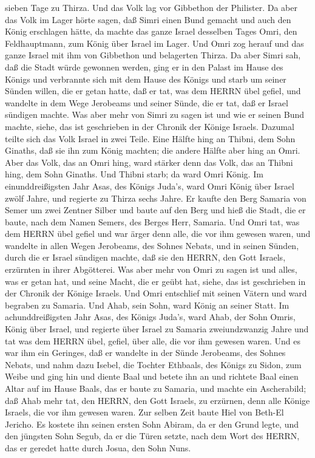 sieben Tage zu Thirza. Und das Volk lag vor Gibbethon der Philister.
 Da aber das Volk im Lager hörte sagen, daß Simri einen
Bund gemacht und auch den König erschlagen hätte, da machte das ganze
Israel desselben Tages Omri, den Feldhauptmann, zum König über Israel im
Lager.  Und Omri zog herauf und das ganze Israel mit ihm
von Gibbethon und belagerten Thirza.  Da aber Simri sah,
daß die Stadt würde gewonnen werden, ging er in den Palast im Hause des
Königs und verbrannte sich mit dem Hause des Königs und starb
 um seiner Sünden willen, die er getan hatte, daß er tat,
was dem HERRN übel gefiel, und wandelte in dem Wege Jerobeams und seiner
Sünde, die er tat, daß er Israel sündigen machte.  Was aber
mehr von Simri zu sagen ist und wie er seinen Bund machte, siehe, das
ist geschrieben in der Chronik der Könige Israels.  Dazumal
teilte sich das Volk Israel in zwei Teile. Eine Hälfte hing an Thibni,
dem Sohn Ginaths, daß sie ihn zum König machten; die andere Hälfte aber
hing an Omri.  Aber das Volk, das an Omri hing, ward
stärker denn das Volk, das an Thibni hing, dem Sohn Ginaths. Und Thibni
starb; da ward Omri König.  Im einunddreißigsten Jahr Asas,
des Königs Juda's, ward Omri König über Israel zwölf Jahre, und regierte
zu Thirza sechs Jahre.  Er kaufte den Berg Samaria von
Semer um zwei Zentner Silber und baute auf den Berg und hieß die Stadt,
die er baute, nach dem Namen Semers, des Berges Herr, Samaria.
 Und Omri tat, was dem HERRN übel gefiel und war ärger denn
alle, die vor ihm gewesen waren,  und wandelte in allen
Wegen Jerobeams, des Sohnes Nebats, und in seinen Sünden, durch die er
Israel sündigen machte, daß sie den HERRN, den Gott Israels, erzürnten
in ihrer Abgötterei.  Was aber mehr von Omri zu sagen ist
und alles, was er getan hat, und seine Macht, die er geübt hat, siehe,
das ist geschrieben in der Chronik der Könige Israels.  Und
Omri entschlief mit seinen Vätern und ward begraben zu Samaria. Und
Ahab, sein Sohn, ward König an seiner Statt.  Im
achunddreißigsten Jahr Asas, des Königs Juda's, ward Ahab, der Sohn
Omris, König über Israel, und regierte über Israel zu Samaria
zweiundzwanzig Jahre  und tat was dem HERRN übel, gefiel,
über alle, die vor ihm gewesen waren.  Und es war ihm ein
Geringes, daß er wandelte in der Sünde Jerobeams, des Sohnes Nebats, und
nahm dazu Isebel, die Tochter Ethbaals, des Königs zu Sidon, zum Weibe
und ging hin und diente Baal und betete ihn an  und
richtete Baal einen Altar auf im Hause Baals, das er baute zu Samaria,
 und machte ein Ascherabild; daß Ahab mehr tat, den HERRN,
den Gott Israels, zu erzürnen, denn alle Könige Israels, die vor ihm
gewesen waren.  Zur selben Zeit baute Hiel von Beth-El
Jericho. Es kostete ihn seinen ersten Sohn Abiram, da er den Grund
legte, und den jüngsten Sohn Segub, da er die Türen setzte, nach dem
Wort des HERRN, das er geredet hatte durch Josua, den Sohn Nuns.

